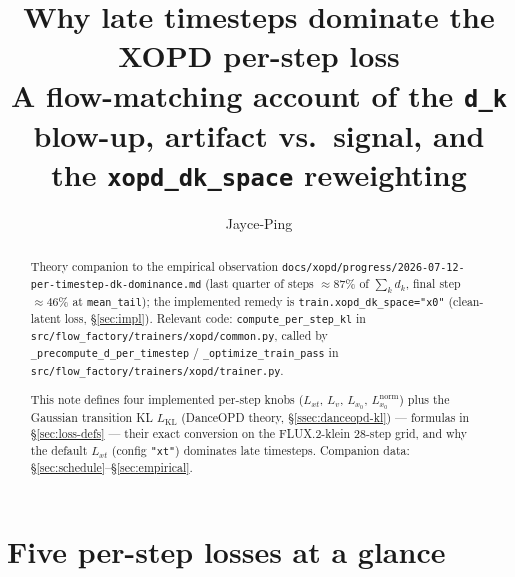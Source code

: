 \documentclass[11pt,a4paper]{article}
\title{\textbf{Why late timesteps dominate the XOPD per-step loss}\\[0.3em]
\large A flow-matching account of the \texttt{d\_k} blow-up, artifact vs.\ signal,
and the \texttt{xopd\_dk\_space} reweighting}
\author{Jayce-Ping}
\date{}
\newcommand{\dk}{d_k}
\begin{document}
\maketitle

\begin{abstract}
Theory companion to the empirical observation
\texttt{docs/xopd/progress/2026-07-12-per-timestep-dk-dominance.md} (last quarter of steps
$\approx 87\%$ of $\sum_k \dk$, final step $\approx 46\%$ at \texttt{mean\_tail}); the implemented remedy is
\texttt{train.xopd\_dk\_space="x0"} (clean-latent loss, \S\ref{sec:impl}). Relevant
code: \texttt{compute\_per\_step\_kl} in
\texttt{src/flow\_factory/trainers/xopd/common.py}, called by
\texttt{\_precompute\_d\_per\_timestep} / \texttt{\_optimize\_train\_pass} in
\texttt{src/flow\_factory/trainers/xopd/trainer.py}.

This note defines four implemented per-step knobs ($L_{xt}$, $L_v$, $L_{x_0}$,
$L_{x_0}^{\mathrm{norm}}$) plus the Gaussian transition KL $L_{\mathrm{KL}}$ (DanceOPD theory,
\S\ref{ssec:danceopd-kl}) --- formulas in \S\ref{sec:loss-defs} --- their exact conversion on the
FLUX.2-klein 28-step grid, and why the default $L_{xt}$ (config \texttt{"xt"}) dominates late
timesteps. Companion data: \S\ref{sec:schedule}--\S\ref{sec:empirical}.
\end{abstract}

\tableofcontents

\section*{Five per-step losses at a glance}
\label{sec:loss-defs}
\end{document}
